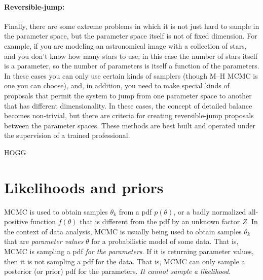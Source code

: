 \documentclass[12pt,twoside,pdftex]{article}
\newcommand{\pars}{\theta}
\begin{document}
\paragraph{Reversible-jump:}
Finally, there are some extreme problems in which it is not just hard
to sample in the parameter space, but the parameter space itself is
not of fixed dimension.
For example, if you are modeling an astronomical image with a
collection of stars, and you don't know how many stars to use; in this
case the number of stars itself is a parameter, so the number of
parameters is itself a function of the parameters.
In these cases you can only use certain kinds of samplers (though M--H
MCMC is one you can choose), and, in addition, you need to make
special kinds of proposals that permit the system to jump from one
parameter space to another that has different dimensionality.
In these cases, the concept of detailed balance becomes non-trivial,
but there are criteria for creating reversible-jump proposals between
the parameter spaces.
These methods are best built and operated under the supervision of a
trained professional.

\begin{problem}
HOGG
\end{problem}

\section{Likelihoods and priors}

MCMC is used to obtain samples $\pars_k$ from a pdf $p(\pars)$,
  or a badly normalized all-positive function $f(\pars)$
  that is different from the pdf by an unknown factor $Z$.
In the context of data analysis,
  MCMC is usually being used to obtain samples $\pars_k$
  that are \emph{parameter values} $\pars$ for a probabilistic model of some data.
That is, MCMC is sampling a pdf \emph{for the parameters}.
If it is returning parameter values, then it is not sampling a pdf for the data.
That is, MCMC can only sample a posterior (or prior) pdf for the parameters.
\emph{It cannot sample a likelihood.}%
\end{document}

